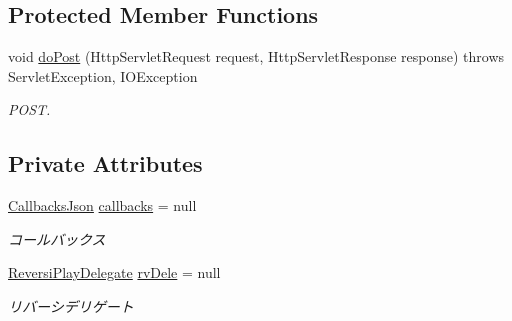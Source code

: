 \subsection*{Protected Member Functions}
\begin{DoxyCompactItemize}
\item 
void \hyperlink{classjp_1_1gr_1_1java__conf_1_1yuta__yoshinaga_1_1reversi_1_1controller_1_1_front_controller_a2f0d63da6e6fc17d2ecf2695af6f8d99}{do\+Post} (Http\+Servlet\+Request request, Http\+Servlet\+Response response)  throws Servlet\+Exception, I\+O\+Exception 
\begin{DoxyCompactList}\small\item\em P\+O\+ST. \end{DoxyCompactList}\end{DoxyCompactItemize}
\subsection*{Private Attributes}
\begin{DoxyCompactItemize}
\item 
\mbox{\label{classjp_1_1gr_1_1java__conf_1_1yuta__yoshinaga_1_1reversi_1_1controller_1_1_front_controller_aba15286819435469622375192358dee7}} 
\hyperlink{classjp_1_1gr_1_1java__conf_1_1yuta__yoshinaga_1_1reversi_1_1model_1_1_callbacks_json}{Callbacks\+Json} \hyperlink{classjp_1_1gr_1_1java__conf_1_1yuta__yoshinaga_1_1reversi_1_1controller_1_1_front_controller_aba15286819435469622375192358dee7}{callbacks} = null
\begin{DoxyCompactList}\small\item\em コールバックス \end{DoxyCompactList}\item 
\mbox{\label{classjp_1_1gr_1_1java__conf_1_1yuta__yoshinaga_1_1reversi_1_1controller_1_1_front_controller_a582bcd1cbb69aaf686182d85dbd21f2d}} 
\hyperlink{classjp_1_1gr_1_1java__conf_1_1yuta__yoshinaga_1_1reversi_1_1model_1_1_reversi_play_delegate}{Reversi\+Play\+Delegate} \hyperlink{classjp_1_1gr_1_1java__conf_1_1yuta__yoshinaga_1_1reversi_1_1controller_1_1_front_controller_a582bcd1cbb69aaf686182d85dbd21f2d}{rv\+Dele} = null
\begin{DoxyCompactList}\small\item\em リバーシデリゲート \end{DoxyCompactList}\end{DoxyCompactItemize}
